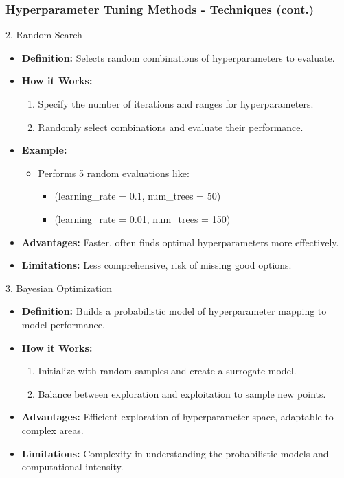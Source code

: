 \documentclass[aspectratio=169]{beamer}
\begin{document}
\begin{frame}[fragile]
    \frametitle{Hyperparameter Tuning Methods - Techniques (cont.)}
    \begin{block}{2. Random Search}
        \begin{itemize}
            \item \textbf{Definition:} Selects random combinations of hyperparameters to evaluate.
            \item \textbf{How it Works:}
            \begin{enumerate}
                \item Specify the number of iterations and ranges for hyperparameters.
                \item Randomly select combinations and evaluate their performance.
            \end{enumerate}
            \item \textbf{Example:} 
            \begin{itemize}
                \item Performs 5 random evaluations like: 
                \begin{itemize}
                    \item (learning\_rate = 0.1, num\_trees = 50)
                    \item (learning\_rate = 0.01, num\_trees = 150)
                \end{itemize}
            \end{itemize}
            \item \textbf{Advantages:} Faster, often finds optimal hyperparameters more effectively.
            \item \textbf{Limitations:} Less comprehensive, risk of missing good options.
        \end{itemize}
    \end{block}
    
    \begin{block}{3. Bayesian Optimization}
        \begin{itemize}
            \item \textbf{Definition:} Builds a probabilistic model of hyperparameter mapping to model performance.
            \item \textbf{How it Works:}
            \begin{enumerate}
                \item Initialize with random samples and create a surrogate model.
                \item Balance between exploration and exploitation to sample new points.
            \end{enumerate}
            \item \textbf{Advantages:} Efficient exploration of hyperparameter space, adaptable to complex areas.
            \item \textbf{Limitations:} Complexity in understanding the probabilistic models and computational intensity.
        \end{itemize}
    \end{block}
\end{frame}
\end{document}
